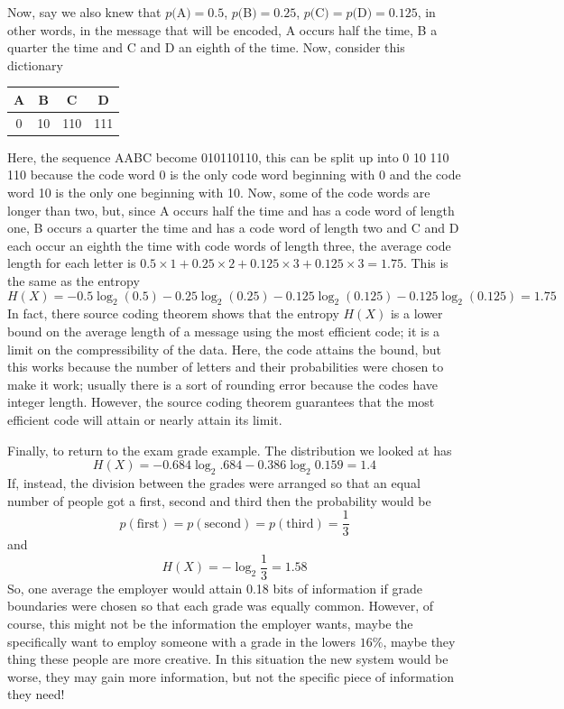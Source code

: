 \documentclass[12pt]{article}
\begin{document}
Now, say we also knew that $p($A$)=0.5$, $p($B$)=0.25$,
$p($C$)=p($D$)=0.125$, in other words, in the message that will be
encoded, A occurs half the time, B a quarter the time and C and D an
eighth of the time. Now, consider this dictionary
\begin{center}
\begin{tabular}{cccc}
A&B&C&D\\
\hline
0&10&110&111
\end{tabular}
\end{center}
Here, the sequence AABC become 010110110, this can be split up into 0
10 110 110 because the code word 0 is the only code word beginning
with 0 and the code word 10 is the only one beginning with 10. Now,
some of the code words are longer than two, but, since A occurs half
the time and has a code word of length one, B occurs a quarter the
time and has a code word of length two and C and D each occur an
eighth the time with code words of length three, the average code
length for each letter is $0.5\times 1 +0.25\times 2 + 0.125\times 3 +
0.125\times 3=1.75$. This is the same as the entropy
\begin{equation}
H(X)=-0.5\log_2(0.5)-0.25\log_2(0.25)-0.125\log_2(0.125)-0.125\log_2(0.125)=1.75
\end{equation}
In fact, there source coding theorem shows that the entropy $H(X)$ is
a lower bound on the average length of a message using the most
efficient code; it is a limit on the compressibility of the
data. Here, the code attains the bound, but this works because the
number of letters and their probabilities were chosen to make it work;
usually there is a sort of rounding error because the codes have
integer length. However, the source coding theorem guarantees that the
most efficient code will attain or nearly attain its limit.

Finally, to return to the exam grade example. The distribution we looked at has
\begin{equation}
H(X)=-0.684\log_2{.684}-0.386\log_2{0.159}=1.4
\end{equation}
If, instead, the division between the grades were arranged so that an equal number of people got a first, second and third then the probability would be 
\begin{equation}
p(\mbox{first})=p(\mbox{second})=p(\mbox{third})=\frac{1}{3}
\end{equation}
and
\begin{equation}
H(X)=-\log_2\frac{1}{3}=1.58
\end{equation}
So, one average the employer would attain 0.18 bits of information if
grade boundaries were chosen so that each grade was equally
common. However, of course, this might not be the information the
employer wants, maybe the specifically want to employ someone with a
grade in the lowers $16\%$, maybe they thing these people are more
creative. In this situation the new system would be worse, they may
gain more information, but not the specific piece of information they
need!
\end{document}
